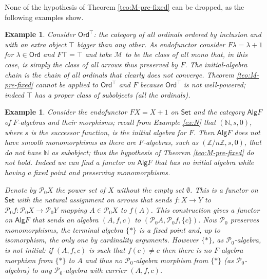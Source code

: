 \documentclass[letterpaper, 11pt, oneside]{memoir}
\theoremstyle{myteo}
\newtheorem{example}[theorem]{Example}
\numberwithin{equation}{section}
\newcommand{\Ord}{\textsf{Ord}}
\newcommand{\Alg}{\textsf{Alg}}
\newcommand{\Set}{\textsf{Set}}
\newcommand{\N}{\mathbb{N}}
\begin{document}
None of the hypothesis of Theorem \ref{teo:M-pre-fixed} can be dropped, as the following examples show.

\begin{example}
  Consider \(\Ord^\top\): the category of all ordinals ordered by inclusion and with an extra object \(\top\) bigger than any other.
  As endofunctor consider \(F\lambda = \lambda+1\) for \(\lambda \in \Ord\) and \(F\top = \top\) and take \(\mathcal{M}\) to be the class of all mono that, in this case, is simply the class of all arrows thus preserved by \(F\).
  The initial-algebra chain is the chain of all ordinals that clearly does not converge.
  Theorem \ref{teo:M-pre-fixed} cannot be applied to \(\Ord^\top\) and \(F\) because \(\Ord^\top\) is not well-powered; indeed \(\top\) has a proper class of subobjects (all the ordinals).
\end{example}

\begin{example}
  Consider the endofunctor \(FX = X + 1\) on \(\Set\) and the category \(\Alg F\) of \(F\)-algebras and their morphisms; recall from Example \ref{ex:N} that  \((\N, s, 0)\), where \(s\) is the successor function, is the initial algebra for \(F\).
  Then \(\Alg F\) does not have smooth monomorphisms as there are \(F\)-algebras, such as \((\mathbb{Z}/n\mathbb{Z}, s, 0)\), that do not have \(\N\) as subobject; thus the hypothesis of Theorem \ref{teo:M-pre-fixed} do not hold.
  Indeed we can find a functor on \(\Alg F\) that has no initial algebra while having a fixed point and preserving monomorphisms.

  Denote by \(\mathcal{P}_0X\) the power set of \(X\) without the empty set \(\emptyset\).
  This is a functor on \(\Set\) with the natural assignment on arrows that sends \(f : X \to Y\) to \(\mathcal{P}_0f : \mathcal{P}_0X \to \mathcal{P}_0Y\) mapping \(A \in \mathcal{P}_0X\) to \(f(A)\).
  This construction gives a functor on \(\Alg F\) that sends an algebra \((A, f, c)\) to \((\mathcal{P}_0A, \mathcal{P}_0f, \{c\})\).
  Now \(\mathcal{P}_0\) preserves monomorphisms, the terminal algebra \(\{*\}\) is a fixed point and, up to isomorphism, the only one by cardinality arguments.
  However \(\{*\}\), as \(\mathcal{P}_0\)-algebra, is not initial: if \((A, f, c)\) is such that \(f(c) \neq c\) then there is no \(F\)-algebra morphism from \(\{*\}\) to \(A\) and thus no \(\mathcal{P}_0\)-algebra morphism from \(\{*\}\) (as \(\mathcal{P}_0\)-algebra) to any \(\mathcal{P}_0\)-algebra with carrier \((A, f, c)\).
\end{example}
\end{document}
